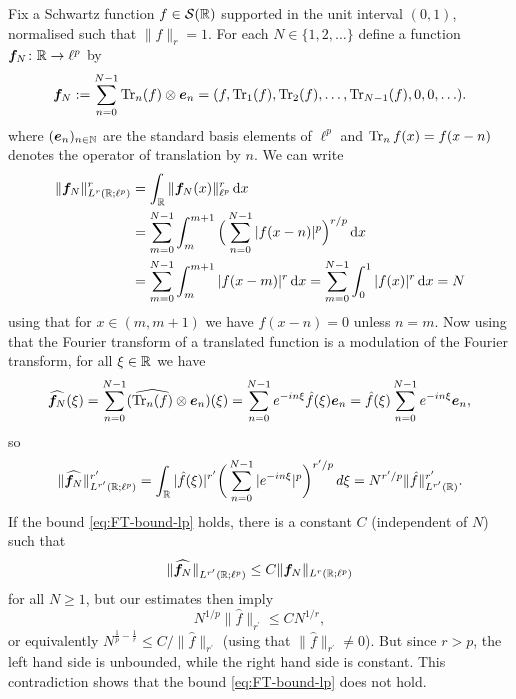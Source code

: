 \begin{example}
  Fix a Schwartz function $f \in \mathcal{S}(\mathbb{R})$ supported in the unit interval $(0,1)$, normalised such that $\|f\|_r = 1$.
  For each $N \in \{1,2,\ldots\}$ define a function $\bm{f}_N \colon \mathbb{R} \rightarrow \ell^p$ by
  \begin{equation*}
      \bm{f}_N := \sum_{n=0}^{N-1} \operatorname{Tr}_{n}(f) \otimes \bm{e}_n
      = (f, \operatorname{Tr}_{1}(f), \operatorname{Tr}_{2}(f), \ldots, \operatorname{Tr}_{N-1}(f), 0, 0, \ldots).
  \end{equation*}
  where $(\bm{e}_{n})_{n \in \mathbb{N}}$ are the standard basis elements of $\ell^p$ and $\operatorname{Tr}_{n}f(x) = f(x-n)$ denotes the operator of translation by $n$.
  We can write
  \begin{equation*}
    \begin{aligned}
      \|\bm{f}_N\|_{L^r(\mathbb{R};\ell^p)}^{r}
      &= \int_{\mathbb{R}} \|\bm{f}_N(x)\|_{\ell^p}^r \, \mathrm{d} x  \\
      &= \sum_{m=0}^{N-1} \int_{m}^{m+1} \Big(\sum_{n=0}^{N-1} |f(x-n)|^p \Big)^{r/p} \, \mathrm{d} x \\
      &= \sum_{m=0}^{N-1} \int_{m}^{m+1} |f(x-m)|^r \, \mathrm{d} x 
      = \sum_{m=0}^{N-1} \int_0^1 |f(x)|^r \, \mathrm{d} x = N
    \end{aligned}
  \end{equation*}
  using that for $x \in (m,m+1)$ we have $f(x-n) = 0$ unless $n=m$.
  Now using that the Fourier transform of a translated function is a modulation of the Fourier transform, for all $\xi \in \mathbb{R}$ we have
  \begin{equation*}
      \widehat{\bm{f}_N}(\xi) = \sum_{n=0}^{N-1} (\widehat{\operatorname{Tr}_{n}(f)} \otimes \bm{e}_n)(\xi) 
      = \sum_{n=0}^{N-1} e^{-in\xi} \hat{f}(\xi) \bm{e}_n 
      = \hat{f}(\xi) \sum_{n=0}^{N-1} e^{-in\xi} \bm{e}_n,
  \end{equation*}
  so
  \begin{equation*}
    \|\widehat{\bm{f}_N}\|_{L^{r^\prime}(\mathbb{R};\ell^p)}^{r'}
    = \int_{\mathbb{R}} |\hat{f}(\xi)|^{r^\prime} \bigg( \sum_{n=0}^{N-1} |e^{-in\xi}|^p \bigg)^{r^\prime/p} \, d\xi 
    = N^{r'/p} \|\hat{f}\|_{L^{r^\prime}(\mathbb{R})}^{r'}.
  \end{equation*}
  If the bound \eqref{eq:FT-bound-lp} holds, there is a constant $C$ (independent of $N$) such that
  \begin{equation*}
    \|\widehat{\bm{f}_N}\|_{L^{r^\prime}(\mathbb{R};\ell^p)} \leq C \|\bm{f}_N\|_{L^r(\mathbb{R};\ell^p)}
  \end{equation*}
  for all $N \geq 1$, but our estimates then imply
  \begin{equation*}
    N^{1/p} \|\hat{f}\|_{r^\prime} \leq C N^{1/r},
  \end{equation*}
  or equivalently $N^{\frac{1}{p} - \frac{1}{r}} \leq C/\|\hat{f}\|_{r^\prime}$ (using that $\|\hat{f}\|_{r^\prime} \neq 0$).
  But since $r > p$, the left hand side is unbounded, while the right hand side is constant.
  This contradiction shows that the bound \eqref{eq:FT-bound-lp} does not hold.
\end{example}


